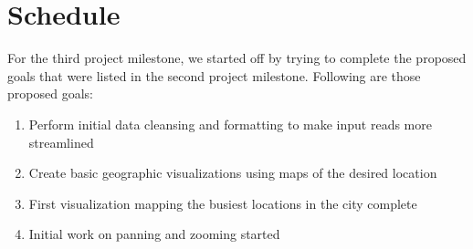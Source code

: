 \section{Schedule} 
\label{sec:schedule}

For the third project milestone, we started off by trying to complete the proposed goals that were listed in the second project milestone. Following are those proposed goals:
\begin{enumerate}
    \item Perform initial data cleansing and formatting to make input reads more streamlined
    \item Create basic geographic visualizations using maps of the desired location
    \item First visualization mapping the busiest locations in the city complete
    \item Initial work on panning and zooming started
\end{enumerate}

